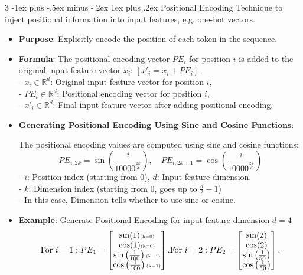 \documentclass[a4paper, 9pt, landscape]{article}
\makeatletter
\renewcommand{\subsubsection}{\@startsection{subsubsection}{3}{0mm}%
                                {-1ex plus -.5ex minus -.2ex}%
                                {1ex plus .2ex}%
                                {\normalfont\small\bfseries}}
\makeatother
\begin{document}
\begin{multicols*}{3}
\subsubsection{Positional Encoding}
Technique to inject positional information into input features, e.g. one-hot vectors.
\begin{itemize}
\item \textbf{Purpose}: Explicitly encode the position of each token in the sequence.
\item \textbf{Formula}: The positional encoding vector $ PE_i $ for position $ i $ is added to the original input feature vector $ x_i $: 
\quad $[x'_i = x_i + PE_i]$.\\
- $ x_i \in \mathbb{R}^d $: Original input feature vector for position $ i $,\\
- $ PE_i \in \mathbb{R}^d $: Positional encoding vector for position $ i $,\\
- $ x'_i \in \mathbb{R}^d $: Final input feature vector after adding positional encoding.
\item \textbf{Generating Positional Encoding Using Sine and Cosine Functions}:

The positional encoding values are computed using sine and cosine functions:
$$
PE_{i, 2k} = \sin\left(\frac{i}{10000^{\frac{2k}{d}}}\right), \quad PE_{i, 2k+1} = \cos\left(\frac{i}{10000^{\frac{2k}{d}}}\right)
$$  
- $ i $: Position index (starting from 0), \quad $ d $: Input feature dimension.\\
- $ k $: Dimension index (starting from 0, goes up to $\frac{d}{2} - 1$) \\    
- In this case, Dimension tells whether to use sine or cosine.
\item \textbf{Example}: Generate Positional Encoding for input feature dimension $ d = 4 $
    $$
    \text{For $ i = 1 $}: PE_1 =
    \begin{bmatrix}
    \sin(1) \text{\tiny (k=0)}\\
    \cos(1) \text{\tiny (k=0)}\\
    \sin\left(\frac{1}{100}\right) \text{\tiny (k=1)} \\
    \cos\left(\frac{1}{100}\right) \text{\tiny (k=1)}
    \end{bmatrix}.
 	\text{For $ i = 2 $}: PE_2 =
    \begin{bmatrix}
    \sin(2) \\
    \cos(2) \\
    \sin\left(\frac{1}{50}\right) \\
    \cos\left(\frac{1}{50}\right)
    \end{bmatrix}.
    $$
    

\end{itemize}
\end{multicols*}
\end{document}
